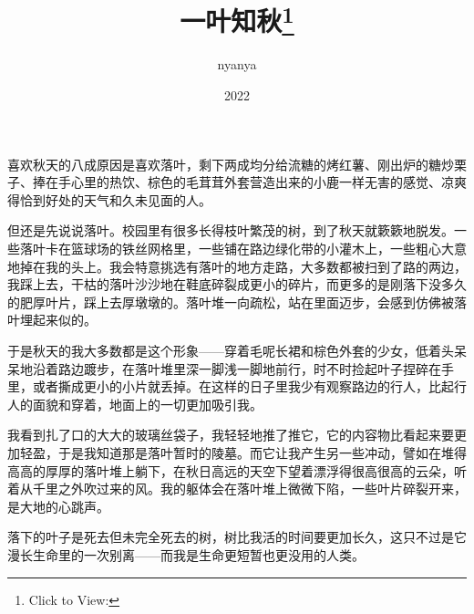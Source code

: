 \documentclass{article}
\title{一叶知秋\footnote{Click to View:\url{}}}
\author{nyanya}
\date{2022}
\begin{document}



\Large

喜欢秋天的八成原因是喜欢落叶，剩下两成均分给流糖的烤红薯、刚出炉的糖炒栗子、捧在手心里的热饮、棕色的毛茸茸外套营造出来的小鹿一样无害的感觉、凉爽得恰到好处的天气和久未见面的人。



但还是先说说落叶。校园里有很多长得枝叶繁茂的树，到了秋天就簌簌地脱发。一些落叶卡在篮球场的铁丝网格里，一些铺在路边绿化带的小灌木上，一些粗心大意地掉在我的头上。我会特意挑选有落叶的地方走路，大多数都被扫到了路的两边，我踩上去，干枯的落叶沙沙地在鞋底碎裂成更小的碎片，而更多的是刚落下没多久的肥厚叶片，踩上去厚墩墩的。落叶堆一向疏松，站在里面迈步，会感到仿佛被落叶埋起来似的。



于是秋天的我大多数都是这个形象——穿着毛呢长裙和棕色外套的少女，低着头呆呆地沿着路边踱步，在落叶堆里深一脚浅一脚地前行，时不时捡起叶子捏碎在手里，或者撕成更小的小片就丢掉。在这样的日子里我少有观察路边的行人，比起行人的面貌和穿着，地面上的一切更加吸引我。



我看到扎了口的大大的玻璃丝袋子，我轻轻地推了推它，它的内容物比看起来要更加轻盈，于是我知道那是落叶暂时的陵墓。而它让我产生另一些冲动，譬如在堆得高高的厚厚的落叶堆上躺下，在秋日高远的天空下望着漂浮得很高很高的云朵，听着从千里之外吹过来的风。我的躯体会在落叶堆上微微下陷，一些叶片碎裂开来，是大地的心跳声。



落下的叶子是死去但未完全死去的树，树比我活的时间要更加长久，这只不过是它漫长生命里的一次别离——而我是生命更短暂也更没用的人类。
\end{document}
